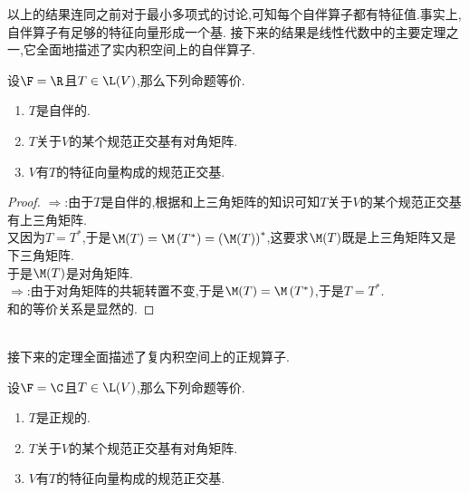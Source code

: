 \documentclass{ctexart}
\begin{document}
以上的结果连同之前对于最小多项式的讨论,可知每个自伴算子都有特征值.事实上,自伴算子有足够的特征向量形成一个基.%
接下来的结果是线性代数中的主要定理之一,它全面地描述了实内积空间上的自伴算子.
\begin{formal}[1.3 实谱定理]
    设$\F=\R$且$T\in\L(V)$,那么下列命题等价.
    \begin{enumerate}[label=\tbf{(\alph*)}]
        \item $T$是自伴的.
        \item $T$关于$V$的某个规范正交基有对角矩阵.
        \item $V$有$T$的特征向量构成的规范正交基.
    \end{enumerate}
\end{formal}
\begin{proof}
    $\Rightarrow$:由于$T$是自伴的,根据和上三角矩阵的知识可知$T$关于$V$的某个规范正交基有上三角矩阵.\\
    又因为$T=T^*$,于是$\M(T)=\M\left(T^*\right)=\left(\M(T)\right)^*$,这要求$\M(T)$既是上三角矩阵又是下三角矩阵.\\
    于是$\M(T)$是对角矩阵.\\
    $\Rightarrow$:由于对角矩阵的共轭转置不变,于是$\M(T)=\M\left(T^*\right)$,于是$T=T^*$.\\
    和的等价关系是显然的.
\end{proof}\noindent
{}\\
接下来的定理全面描述了复内积空间上的正规算子.
\begin{formal}[2.1 复谱定理]
    设$\F=\C$且$T\in\L(V)$,那么下列命题等价.
    \begin{enumerate}[label=\tbf{(\alph*)}]
        \item $T$是正规的.
        \item $T$关于$V$的某个规范正交基有对角矩阵.
        \item $V$有$T$的特征向量构成的规范正交基.
    \end{enumerate}
\end{formal}
\end{document}

